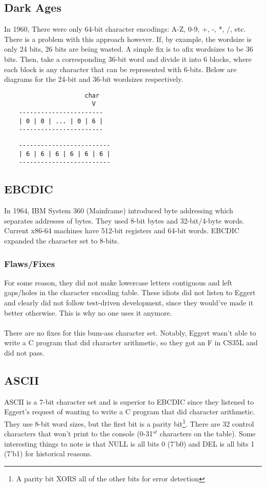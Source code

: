 \documentclass[13pt]{article}
\begin{document}
\subsection{Dark Ages}
In 1960, There were only 64-bit character encodings: A-Z, 0-9, +, -, *, /, etc. There is a problem with this approach however. If, by example, the wordsize is only 24 bits, 26 bits are being wasted. A simple fix is to afix wordsizes to be 36 bits. Then, take a corresponding 36-bit word and divide it into 6 blocks, where each block is any character that can be represented with 6-bits. Below are diagrams for the 24-bit and 36-bit wordsizes respectively.
\begin{verbatim}
                      char                        
                        V
    -----------------------
    | 0 | 0 | ... | 0 | 6 |
    -----------------------
\end{verbatim}

\begin{verbatim}
    -------------------------
    | 6 | 6 | 6 | 6 | 6 | 6 |
    -------------------------
\end{verbatim}




\subsection{EBCDIC}
In 1964, IBM System 360 (Mainframe) introduced byte addressing which separates addresses of bytes. They used 8-bit bytes and 32-bit/4-byte words. Current x86-64 machines have 512-bit registers and 64-bit words. EBCDIC expanded the character set to 8-bits.

\subsubsection{Flaws/Fixes}
For some reason, they did not make lowercase letters contiguous and left gaps/holes in the character encoding table. These idiots did not listen to Eggert and clearly did not follow test-driven development, since they would've made it better otherwise. This is why no one uses it anymore. \\ \\
There are no fixes for this bum-ass character set. Notably, Eggert wasn't able to write a C program that did character arithmetic, so they got an F in CS35L and did not pass.





\subsection{ASCII}
ASCII is a 7-bit character set and is superior to EBCDIC since they listened to Eggert's request of wanting to write a C program that did character arithmetic. They use 8-bit word sizes, but the first bit is a parity bit\footnote{A parity bit XORS all of the other bits for error detection}. There are 32 control characters that won't print to the console (0-31$^{st}$ characters on the table). Some interesting things to note is that NULL is all bits 0 (7'b0) and DEL is all bits 1 (7'b1) for historical reasons.
\end{document}
